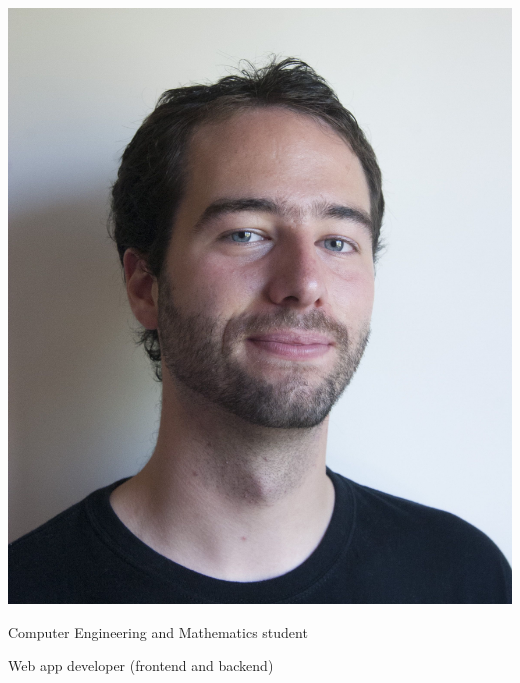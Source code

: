 \documentclass[a4paper, 10pt]{article}
\begin{document}
	\null

	\vspace{0.3cm}

	\begin{minipage}{0.23\linewidth}   

		\vspace{70pt}
		\includegraphics[width=0.20\linewidth]{images/me.jpg}

	\end{minipage}%
	\begin{minipage}{0.75\linewidth}

		\begin{flushright}

			\vspace{-25pt}

	  	{}

	  	\vspace{25pt}

		{\selectfont

			{\fontsize{1.6em}{2em}\selectfont Computer Engineering and Mathematics student

			Web app developer (frontend and backend)

			}
		}

	\end{flushright}

	\end{minipage}

	\vspace{0.5cm}
\end{document}

